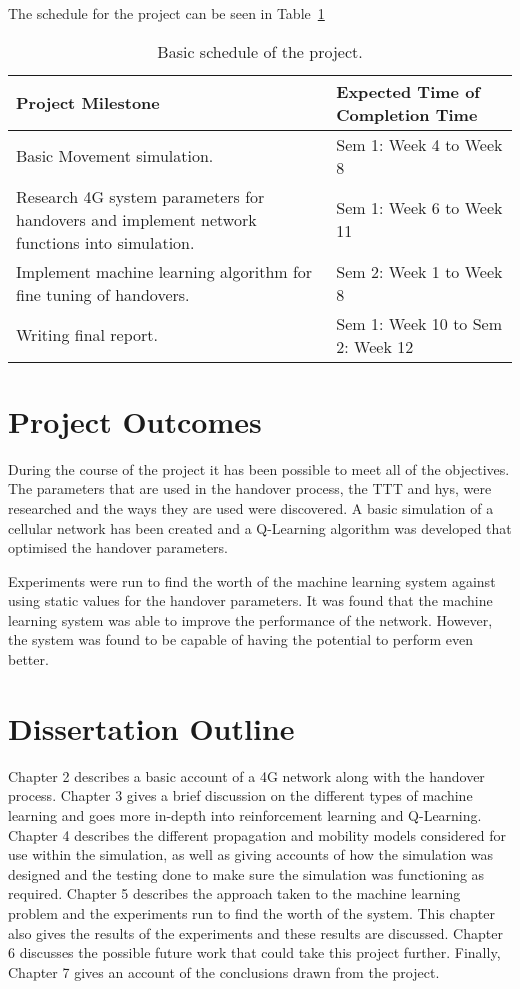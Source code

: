 The schedule for the project can be seen in Table~\ref{tab:sch}
\begin{table}[H]
  \begin{center}
    \begin{tabular}{| p{8cm} | p{5.5cm} |}
  	  \hline
      \textbf{Project Milestone} & \textbf{Expected Time of Completion Time} \\ \hline
      Basic Movement simulation. & Sem 1: Week 4 to Week 8  \\ \hline
      Research 4G system parameters for handovers and implement network functions into simulation. & Sem 1: Week 6 to Week 11 \\ \hline
      Implement machine learning algorithm for fine tuning of handovers. & Sem 2: Week 1 to Week 8 \\ \hline
      Writing final report. & Sem 1: Week 10 to Sem 2: Week 12  \\ \hline
  	\end{tabular}
  \end{center}
  \caption{Basic schedule of the project.}
  \label{tab:sch}
\end{table}
\section{Project Outcomes}
During the course of the project it has been possible to meet all of the objectives. The parameters that are used in the handover process, the \ac{TTT} and \ac{hys}, were researched and the ways they are used were discovered. A basic simulation of a cellular network has been created and a Q-Learning algorithm was developed that optimised the handover parameters.

Experiments were run to find the worth of the machine learning system against using static values for the handover parameters. It was found that the machine learning system was able to improve the performance of the network. However, the system was found to be capable of having the potential to perform even better.   
\section{Dissertation Outline}
Chapter 2 describes a basic account of a 4G network along with the handover process. Chapter 3 gives a brief discussion on the different types of machine learning and goes more in-depth into reinforcement learning and Q-Learning. Chapter 4 describes the different propagation and mobility models considered for use within the simulation, as well as giving accounts of how the simulation was designed and the testing done to make sure the simulation was functioning as required. Chapter 5 describes the approach taken to the machine learning problem and the experiments run to find the worth of the system. This chapter also gives the results of the experiments and these results are discussed. Chapter 6 discusses the possible future work that could take this project further. Finally, Chapter 7 gives an account of the conclusions drawn from the project.